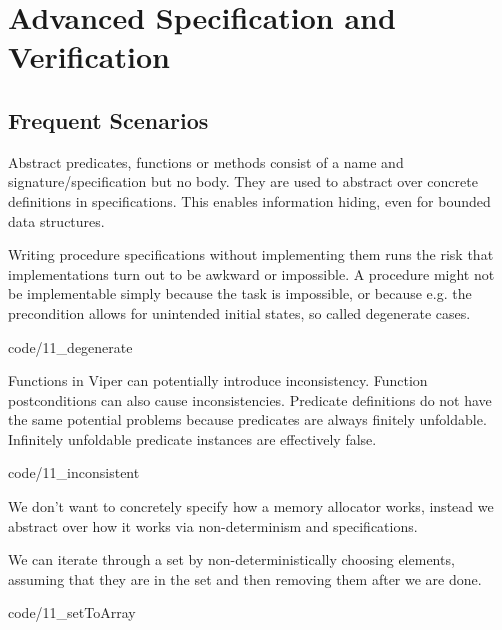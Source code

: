 \section{Advanced Specification and Verification}

\subsection{Frequent Scenarios}
\begin{mytitle}[Abstraction] Abstract predicates, functions or methods consist of a name and signature/specification but no body. They are used to abstract over concrete definitions in specifications. This enables information hiding, even for bounded data structures.
\end{mytitle}
\begin{mytitle} Writing procedure specifications without implementing them runs the risk that implementations turn out to be awkward or impossible. A procedure might not be implementable simply because the task is impossible, or because e.g. the precondition allows for unintended initial states, so called degenerate cases.
\end{mytitle}
 {code/11_degenerate}
\begin{mytitle} Functions in Viper can potentially introduce inconsistency. Function postconditions can also cause inconsistencies. Predicate definitions do not have the same potential problems because predicates are always finitely unfoldable. Infinitely unfoldable predicate instances are effectively false.
\end{mytitle}
 {code/11_inconsistent}
\begin{mytitle} We don't want to concretely specify how a memory allocator works, instead we abstract over how it works via non-determinism and specifications. 
\end{mytitle}
\begin{mytitle} We can iterate through a set by non-deterministically choosing elements, assuming that they are in the set and then removing them after we are done.
\end{mytitle}
 {code/11_setToArray}


